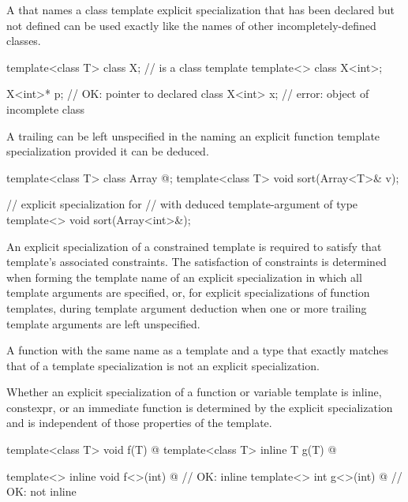 \pnum
A
that names a class template explicit specialization that has been declared but
not defined can be used exactly like the names of other incompletely-defined
classes.
\begin{example}
\begin{codeblock}
template<class T> class X;                      //  is a class template
template<> class X<int>;

X<int>* p;                                      // OK: pointer to declared class 
X<int> x;                                       // error: object of incomplete class 
\end{codeblock}
\end{example}

\pnum
A trailing
can be left unspecified in the
naming an explicit function template specialization
provided it can be deduced.
\begin{example}
\begin{codeblock}
template<class T> class Array { @\commentellip@ };
template<class T> void sort(Array<T>& v);

// explicit specialization for 
// with deduced template-argument of type 
template<> void sort(Array<int>&);
\end{codeblock}
\end{example}

\pnum
\begin{note}
An explicit specialization of a constrained template is required
to satisfy that template's associated constraints.
The satisfaction of constraints is determined
when forming the template name of an explicit specialization
in which all template arguments are specified,
or, for explicit specializations of function templates,
during template argument deduction
when one or more trailing template arguments are left unspecified.
\end{note}

\pnum
A function with the same name as a template and a type that exactly matches that
of a template specialization is not an explicit specialization.

\pnum
Whether an explicit specialization of a function or variable template
is inline, constexpr, or an immediate function
is determined by the explicit specialization and
is independent of those properties of the template.
\begin{example}
\begin{codeblock}
template<class T> void f(T) { @\commentellip@ }
template<class T> inline T g(T) { @\commentellip@ }

template<> inline void f<>(int) { @\commentellip@ }   // OK: inline
template<> int g<>(int) { @\commentellip@ }           // OK: not inline
\end{codeblock}
\end{example}

